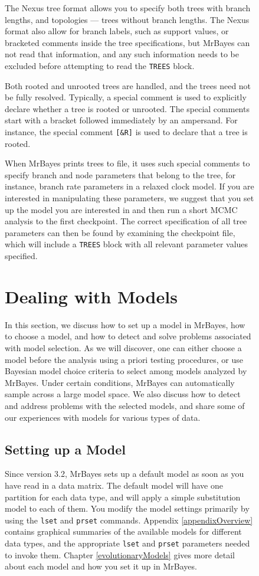 \documentclass[12pt]{book}
\newcommand{\ttt}[1]{\texttt{#1}}
\begin{document}
\begin{figure}[h]
The Nexus tree format allows you to specify both trees with branch lengths, and topologies ---
trees without branch lengths. The Nexus format also allow for branch labels, such as support
values, or bracketed comments inside the tree specifications, but MrBayes can not read that
information, and any such information needs to be excluded before attempting to read the
\ttt{TREES} block.

Both rooted and unrooted trees are handled, and the trees need not be fully resolved. Typically, a
special comment is used to explicitly declare whether a tree is rooted or unrooted. The special
comments start with a bracket followed immediately by an ampersand. For instance, the special
comment \ttt{[\&R]} is used to declare that a tree is rooted.

When MrBayes prints trees to file, it uses such special comments to specify branch and node
parameters that belong to the tree, for instance, branch rate parameters in a relaxed clock model.
If you are interested in manipulating these parameters, we suggest that you set up the model you
are interested in and then run a short MCMC analysis to the first checkpoint. The correct
specification of all tree parameters can then be found by examining the checkpoint file, which will
include a \ttt{TREES} block with all relevant parameter values specified.

\section{Dealing with Models}

In this section, we discuss how to set up a model in MrBayes, how to choose a model, and how to
detect and solve problems associated with model selection. As we will discover, one can either
choose a model before the analysis using a priori testing procedures, or use Bayesian model choice
criteria to select among models analyzed by MrBayes. Under certain conditions, MrBayes can
automatically sample across a large model space. We also discuss how to detect and address problems
with the selected models, and share some of our experiences with models for various types of data.

\subsection{Setting up a Model}

Since version 3.2, MrBayes sets up a default model as soon as you have read in a data matrix. The
default model will have one partition for each data type, and will apply a simple substitution
model to each of them. You modify the model settings primarily by using the \ttt{lset} and
\ttt{prset} commands. Appendix \ref{appendixOverview} contains graphical summaries of the available
models for different data types, and the appropriate \ttt{lset} and \ttt{prset} parameters needed
to invoke them. Chapter \ref{evolutionaryModels} gives more detail about each model and how you set
it up in MrBayes.


\end{figure}
\end{document}
